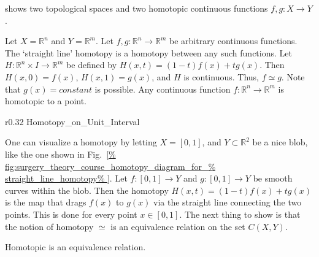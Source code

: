 \documentclass[crop=false,class=article,oneside]{standalone}
\begin{document}
        shows two topological spaces and two homotopic
        continuous functions $f,g:{X}\rightarrow{Y}$.
        \begin{example}
            Let $X=\mathbb{R}^{n}$ and $Y=\mathbb{R}^{m}$. Let
            $f,g:\mathbb{R}^{n}\rightarrow\mathbb{R}^{m}$
            be arbitrary continuous functions.
            The `straight line' homotopy is a homotopy
            between any such functions. Let
            $H:\mathbb{R}^{n}\times{I}\rightarrow\mathbb{R}^{m}$
            be defined by $H(x,t)=(1-t)f(x)+tg(x)$. Then
            $H(x,0)=f(x)$, $H(x,1)=g(x)$, and
            $H$ is continuous. Thus, ${f}\simeq{g}$.
            Note that $g(x)=constant$ is possible.
            Any continuous function
            $f:\mathbb{R}^{n}\rightarrow\mathbb{R}^{m}$
            is homotopic to a point.
        \end{example}
        \begin{wrapfigure}[8]{r}{0.32\textwidth}
            \centering
            \captionsetup{type=figure}
            \vspace{-1ex}
            {Homotopy_on_Unit_Interval}
            \caption{Straight-Line Homotopy.}
            \label{fig:surgery_theory_course_homotopy_diagram_%
                   for_straight_line_homotopy}
        \end{wrapfigure}
        One can visualize a homotopy by letting $X=[0,1]$,
        and $Y\subset\mathbb{R}^{2}$ be a nice blob,
        like the one shown in
        Fig.~\ref{%
            fig:surgery_theory_course_homotopy_diagram_for_%
            straight_line_homotopy%
        }.
        Let $f:[0,1]\rightarrow Y$ and $g:[0,1]\rightarrow Y$
        be smooth curves within the blob. Then the homotopy
        $H(x,t)=(1-t)f(x)+tg(x)$ is the map that drags $f(x)$
        to $g(x)$ via the straight line connecting the two
        points. This is done for every point $x\in [0,1]$.
        The next thing to show is that the notion of
        homotopy $\simeq$ is an equivalence relation on the
        set $C(X,Y)$.
        \begin{theorem}
            Homotopic is an equivalence relation.
        \end{theorem}
\end{document}
